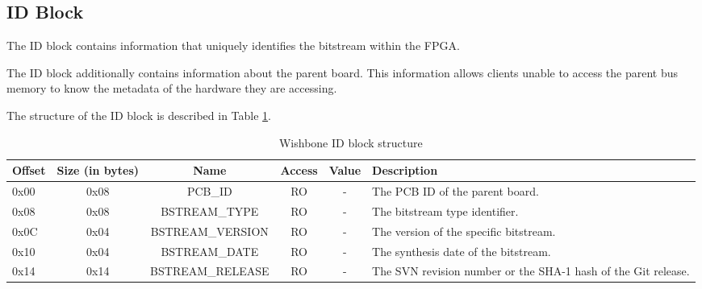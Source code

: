 \documentclass{article}
\begin{document}
\subsection{ID Block}\label{id_block}

The ID block contains information that uniquely identifies the bitstream
within the FPGA.

The ID block additionally contains information about the parent board.
This information allows clients unable to access the parent bus memory
to know the metadata of the hardware they are accessing.

The structure of the ID block is described in Table \ref{id_block_struct}.

\begin{center}
	\begin{savenotes}
	\begin{table}[!ht]\footnotesize
	\caption{Wishbone ID block structure}\label{id_block_struct}\centering
	\begin{tabular}{| l | c | c | c | c | p{5cm} |} \hline
	Offset & Size (in bytes) & Name & Access & Value & Description \\ \hline
	0x00 & 0x08 & PCB\_ID & RO & - & The PCB ID of the parent board. \\ \hline
	0x08 & 0x08 & BSTREAM\_TYPE & RO & - & The bitstream type identifier. \\ \hline
	0x0C & 0x04 & BSTREAM\_VERSION & RO & - & The version of the specific bitstream. \\ \hline
	0x10 & 0x04 & BSTREAM\_DATE & RO & - & The synthesis date of the bitstream. \\ \hline
	0x14 & 0x14 & BSTREAM\_RELEASE & RO & - & The SVN revision number or the SHA-1 hash of the Git release. \\ \hline
	\end{tabular}
	\end{table}
	\end{savenotes}
\end{center}
\end{document}

